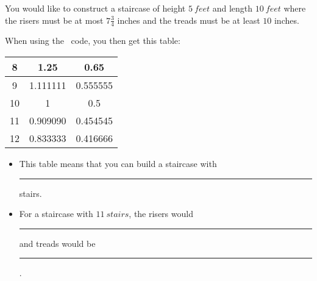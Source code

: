 \documentclass{ximera}
\begin{document}
\begin{exercise}
 You would like to construct a staircase of height $5\ feet$ and
 length $10\ feet$ where the risers must be at most $7\frac{3}{4}$
 inches and the treads must be at least $10$ inches.
 
 

 
When using the \snap\ code, you then get this table:

\begin{tabular}{|c|c|c|}\hline
8&1.25& 0.65\\\hline
9& 1.111111& 0.555555 \\\hline
10 & 1 & 0.5\\\hline
11 & 0.909090 & 0.454545\\\hline
12&0.833333&0.416666\\\hline
\end{tabular}

\begin{itemize}
 \item This table means that you can build a staircase with \rule{2cm}{0.4pt} stairs.
 \item For a staircase with $11\ stairs$, the risers would \rule{2cm}{0.4pt} and treads would be \rule{2cm}{0.4pt}.
\end{itemize}
\end{exercise}
\vfill
{}
\end{document}
